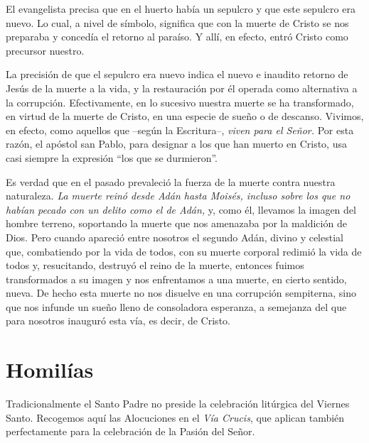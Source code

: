 			\begin{body}El evangelista precisa que en el huerto había un sepulcro y que este sepulcro era nuevo. Lo cual, a nivel de símbolo, significa que con la muerte de Cristo se nos preparaba y concedía el retorno al paraíso. Y allí, en efecto, entró Cristo como precursor nuestro.\end{body}
			
			\begin{body}La precisión de que el sepulcro era nuevo indica el nuevo e inaudito retorno de Jesús de la muerte a la vida, y la restauración por él operada como alternativa a la corrupción. Efectivamente, en lo sucesivo nuestra muerte se ha transformado, en virtud de la muerte de Cristo, en una especie de sueño o de descanso. Vivimos, en efecto, como aquellos que –según la Escritura–, \textit{viven para el Señor. }Por esta razón, el apóstol san Pablo, para designar a los que han muerto en Cristo, usa casi siempre la expresión “los que se durmieron”.\end{body}
			
			\begin{body}Es verdad que en el pasado prevaleció la fuerza de la muerte contra nuestra naturaleza. \textit{La muerte reinó desde Adán hasta Moisés, incluso sobre los que no habían pecado con un delito como el de Adán,} y, como él, llevamos la imagen del hombre terreno, soportando la muerte que nos amenazaba por la maldición de Dios. Pero cuando apareció entre nosotros el segundo Adán, divino y celestial que, combatiendo por la vida de todos, con su muerte corporal redimió la vida de todos y, resucitando, destruyó el reino de la muerte, entonces fuimos transformados a su imagen y nos enfrentamos a una muerte, en cierto sentido, nueva. De hecho esta muerte no nos disuelve en una corrupción sempiterna, sino que nos infunde un sueño lleno de consoladora esperanza, a semejanza del que para nosotros inauguró esta vía, es decir, de Cristo.\end{body}
			
			\section{Homilías}
			
			\begin{rubrica}Tradicionalmente el Santo Padre no preside la celebración litúrgica del Viernes Santo. Recogemos aquí las Alocuciones en el \textit{Vía Crucis}, que aplican también perfectamente para la celebración de la Pasión del Señor.\end{rubrica}
			
